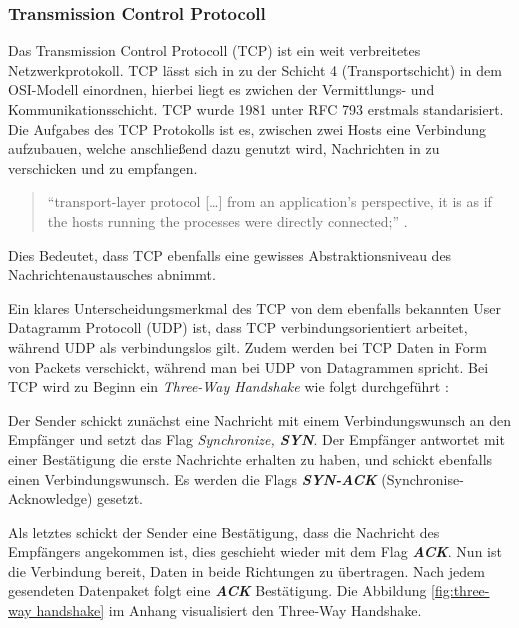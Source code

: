 \documentclass[paper=a4,fontsize=12pt,ngerman]{scrartcl}
\begin{document}
\subsubsection{Transmission Control Protocoll}

Das Transmission Control Protocoll (TCP) ist ein weit verbreitetes Netzwerkprotokoll. 
TCP lässt sich in zu der Schicht 4 (Transportschicht) in dem OSI-Modell einordnen, hierbei liegt es zwichen der Vermittlungs- und Kommunikationsschicht.
\newline TCP wurde 1981 unter RFC 793 erstmals standarisiert. \cite{rfc793}  \newline
Die Aufgabes des TCP Protokolls ist es, zwischen zwei Hosts eine Verbindung aufzubauen, welche anschließend dazu genutzt wird,  
Nachrichten in zu verschicken und zu empfangen.

\begin{quote}
``transport-layer protocol [\dots] from an application’s perspective, it is as if 
the hosts running the processes were directly connected;'' \cite[241]{kr22}.      
\end{quote}


Dies Bedeutet, dass TCP ebenfalls eine gewisses Abstraktionsniveau
des Nachrichtenaustausches abnimmt. 


Ein klares Unterscheidungsmerkmal des TCP von dem ebenfalls bekannten User Datagramm Protocoll (UDP) ist, dass TCP verbindungsorientiert arbeitet, 
während UDP als verbindungslos gilt. Zudem werden bei TCP Daten in Form von Packets verschickt, während man bei UDP von Datagrammen spricht. \newline
Bei TCP wird zu Beginn ein \textit{Three-Way Handshake}
wie folgt durchgeführt : 

Der Sender schickt zunächst eine Nachricht mit einem Verbindungswunsch an den Empfänger und setzt das Flag 
\textit{Synchronize, \textbf{SYN}}.
\newline
Der Empfänger antwortet mit einer Bestätigung die erste Nachrichte erhalten zu haben, und schickt ebenfalls einen 
Verbindungswunsch. Es werden die Flags \textit{\textbf{SYN-ACK}} (Synchronise-Acknowledge) gesetzt.


Als letztes schickt der Sender eine Bestätigung, dass die Nachricht des Empfängers angekommen ist, dies geschieht wieder
mit dem Flag \textit{\textbf{ACK}}. Nun ist die Verbindung bereit, Daten in beide Richtungen zu übertragen.
Nach jedem gesendeten Datenpaket folgt eine \textit{\textbf{ACK}} Bestätigung.
\newline Die Abbildung \ref{fig:three-way handshake} im Anhang visualisiert den Three-Way Handshake.
\end{document}
